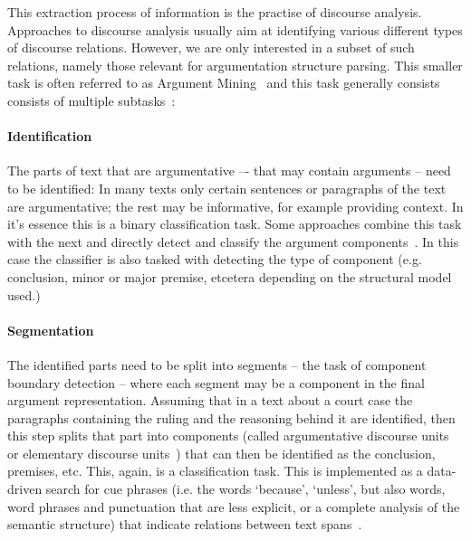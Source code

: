 \documentclass{IOS-Book-Article}
\begin{document}
This extraction process of information is the practise of discourse analysis. Approaches to discourse analysis usually aim at identifying various different types of discourse relations. However, we are only interested in a subset of such relations, namely those relevant for argumentation structure parsing. This smaller task is often referred to as Argument Mining~\cite{stabGurevych2017} and this task generally consists consists of multiple subtasks~\cite{lippi2016argumentation}:

\paragraph{Identification} The parts of text that are argumentative –- that may contain arguments -- need to be identified: In many texts only certain sentences or paragraphs of the text are argumentative; the rest may be informative, for example providing context. In it's essence this is a binary classification task. Some approaches combine this task with the next and directly detect and classify the argument components~\cite{stabGurevych2017}. In this case the classifier is also tasked with detecting the type of component (e.g. conclusion, minor or major premise, etcetera depending on the structural model used.)

\paragraph{Segmentation} The identified parts need to be split into segments -- the task of component boundary detection -- where each segment may be a component in the final argument representation. Assuming that in a text about a court case the paragraphs containing the ruling and the reasoning behind it are identified, then this step splits that part into components (called argumentative discourse units~\cite{cohen1987} or elementary discourse units~\cite{saintDizier2012}) that can then be identified as the conclusion, premises, etc. This, again, is a classification task. This is implemented as a data-driven search for cue phrases (i.e. the words `because', `unless', but also words, word phrases and punctuation that are less explicit, or a complete analysis of the semantic structure) that indicate relations between text spans~\cite{mochales2011argumentation,saintDizier2012,lawrenceReed2015,stabGurevych2017}.
\end{document}
